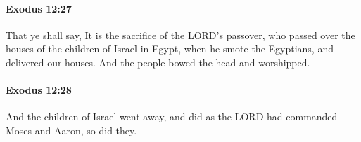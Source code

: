 		\paragraph{Exodus 12:27} %
			\label{EXODUS-12-27}

			That ye shall say, It is the sacrifice of the LORD's passover, who passed over the houses of the children of Israel in Egypt, when he smote the Egyptians, and delivered our houses. And the people bowed the head and worshipped.


		\paragraph{Exodus 12:28} %
			\label{EXODUS-12-28}

			And the children of Israel went away, and did as the LORD had commanded Moses and Aaron, so did they.


